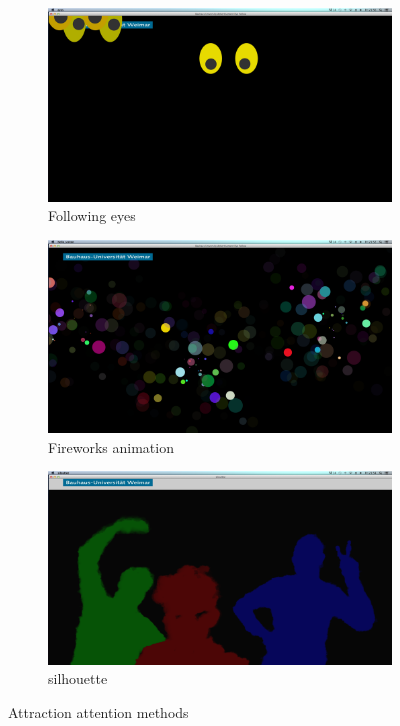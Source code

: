 \begin{figure}[H]
    \centering
    \begin{subfigure}[H]{0.3\textwidth}
        \centering
        \includegraphics[width=\textwidth]{Figures/3/eyes}
        \caption{Following eyes}
        \label{fig:Attraction_eye}
    \end{subfigure}
    \hfill
    \begin{subfigure}[H]{0.3\textwidth}
        \centering
        \includegraphics[width=\textwidth]{Figures/3/fireworks}
        \caption{Fireworks animation}
        \label{fig:Attraction_firework}
    \end{subfigure}
    \hfill  
      \begin{subfigure}[H]{0.3\textwidth}
        \centering
        \includegraphics[width=\textwidth]{Figures/3/silhouttee}
        \caption{silhouette}
        \label{fig:Attraction_silhouette}
    \end{subfigure}
    \caption{Attraction attention methods }
    \label{fig:Attraction_Attention}
\end{figure}


